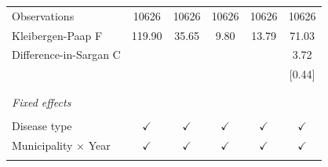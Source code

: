 \begin{tabular}{l c c c c c }
\\
Observations & 10626 & 10626 &  10626 & 10626 & 10626 \\
Kleibergen-Paap F & 119.90 & 35.65 &  9.80 & 13.79 & 71.03 \\
Difference-in-Sargan C &   &   &   &   & 3.72  \\
& & & &  & [0.44] \\
\\
\midrule[1 pt]
\\
\multicolumn{6}{l}{\textit{Fixed effects}} \\
\\
Disease type & $\checkmark$ & $\checkmark$ & $\checkmark$  & $\checkmark$  & $\checkmark$ \\
Municipality $\times$ Year & $\checkmark$   &  $\checkmark$ & $\checkmark$ & $\checkmark$ & $\checkmark$ \\
\\
\midrule[1 pt]
\end{tabular}
